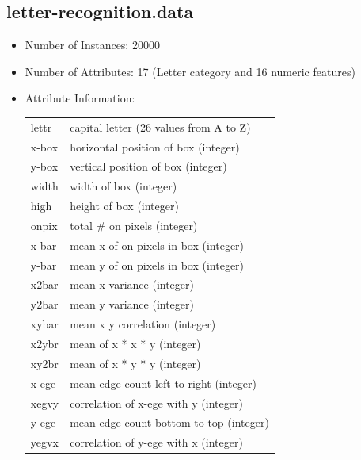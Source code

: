 \documentclass[10pt]{report}
\begin{document}
\subsection*{letter-recognition.data}
\begin{itemize}
\item Number of Instances: 20000
\item Number of Attributes: 17 (Letter category and 16 numeric features)
\item Attribute Information:
  \\
  \begin{left}
    \begin{tabular}{ l p{10cm} }
      lettr	   &    capital letter	(26 values from A to Z) \\
      x-box	   &    horizontal position of box	(integer) \\
      y-box	   &    vertical position of box	(integer) \\
      width	   &    width of box			(integer) \\
      high 	   &    height of box			(integer) \\
      onpix	   &    total # on pixels		(integer) \\
      x-bar	   &    mean x of on pixels in box	(integer) \\
      y-bar	   &    mean y of on pixels in box	(integer) \\
      x2bar	   &    mean x variance			(integer) \\
      y2bar	   &    mean y variance			(integer) \\
      xybar	   &    mean x y correlation		(integer) \\
      x2ybr	   &    mean of x * x * y		(integer) \\
      xy2br	   &    mean of x * y * y		(integer) \\
      x-ege	   &    mean edge count left to right	(integer) \\
      xegvy	   &    correlation of x-ege with y	(integer) \\
      y-ege	   &    mean edge count bottom to top	(integer) \\
      yegvx	   &    correlation of y-ege with x	(integer) \\
    \end{tabular}
  \end{left}
\end{itemize}
\end{document}
